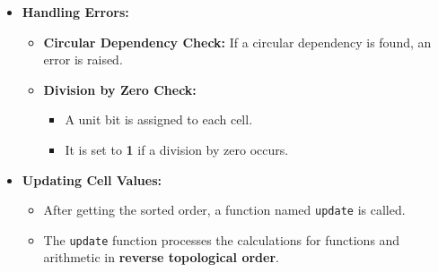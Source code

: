 \documentclass{article}
\begin{document}
\begin{itemize}
    \item \textbf{Handling Errors:}
    \begin{itemize}
        \item \textbf{Circular Dependency Check:} If a circular dependency is found, an error is raised.
        \item \textbf{Division by Zero Check:}
        \begin{itemize}
            \item A unit bit is assigned to each cell.
            \item It is set to \textbf{1} if a division by zero occurs.
        \end{itemize}
    \end{itemize}
    
    \item \textbf{Updating Cell Values:}
    \begin{itemize}
        \item After getting the sorted order, a function named \texttt{update} is called.
        \item The \texttt{update} function processes the calculations for functions and arithmetic in \textbf{reverse topological order}.
    \end{itemize}
\end{itemize}
\end{document}
